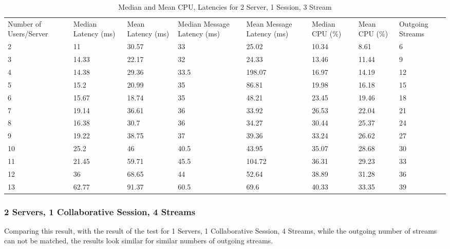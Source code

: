 \begin{table}
\caption{Median and Mean CPU, Latencies for 2 Server, 1 Session, 3 Stream}
\label{table:2serv_1sess_3str}
\begin{tabu} to\linewidth{|X[c]|X[c]|X[c]|X[c]|X[c]|X[c]|X[c]|X[c]|}
\everyrow{\hline}
\hline
Number of Users/Server & Median Latency (ms) & Mean Latency (ms) & Median Message Latency (ms) & Mean Message Latency (ms) & Median CPU (\%) & Mean CPU (\%) & Outgoing Streams\\
2 & 11 & 30.57 & 33 & 25.02 & 10.34 & 8.61 & 6 \\
3 & 14.33 & 22.17 & 32 & 24.33 & 13.46 & 11.44 & 9 \\
4 & 14.38 & 29.36 & 33.5 & 198.07 & 16.97 & 14.19 & 12 \\
5 & 15.2 & 20.99 & 35 & 86.81 & 19.98 & 16.18 & 15 \\
6 & 15.67 & 18.74 & 35 & 48.21 & 23.45 & 19.46 & 18 \\
7 & 19.14 & 36.61 & 36 & 33.92 & 26.53 & 22.04 & 21 \\
8 & 16.38 & 30.7 & 36 & 34.27 & 30.44 & 25.37 & 24 \\
9 & 19.22 & 38.75 & 37 & 39.36 & 33.24 & 26.62 & 27 \\
10 & 25.2 & 46 & 40.5 & 43.95 & 35.07 & 28.68 & 30 \\
11 & 21.45 & 59.71 & 45.5 & 104.72 & 36.31 & 29.23 & 33 \\
12 & 36 & 68.65 & 44 & 52.64 & 38.89 & 31.28 & 36 \\
13 & 62.77 & 91.37 & 60.5 & 69.6 & 40.33 & 33.35 & 39 \\
\end{tabu}
\end{table}

\subsubsection{2 Servers, 1 Collaborative Session, 4 Streams}

Comparing this result, with the result of the test for 1 Servers, 1 Collaborative Session, 4 Streams, while the outgoing number of streams can not be matched, the results look similar for similar numbers of outgoing streams.

